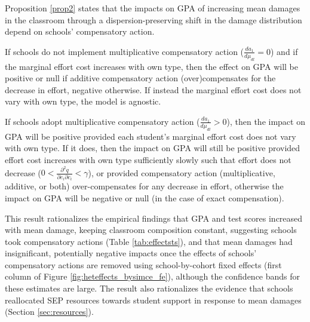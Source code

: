 Proposition \ref{prop2} states that the impacts on GPA of increasing mean damages in the classroom through a dispersion-preserving shift in the damage distribution depend on schools' compensatory action.\par 
If schools do not implement multiplicative compensatory action ($\frac{d a_1}{d \mu_{dl}}=0$) and if the marginal effort cost increases with own type, then the effect on GPA will be positive or null if additive compensatory action (over)compensates for the decrease in effort, negative otherwise. If instead the marginal effort cost does not vary with own type, the model is agnostic.\par 
If schools adopt multiplicative compensatory action  ($\frac{d a_1}{d \mu_{dl}}>0$), then the impact on GPA will be positive provided each student's marginal effort cost does not vary with own type. If it does, then the impact on GPA will still be positive provided effort cost increases with own type sufficiently slowly such that effort does not decrease ($0< \frac{\partial^2 q}{\partial e_i \partial c_i}<\gamma$), or provided compensatory action (multiplicative, additive, or both) over-compensates for any decrease in effort, otherwise the impact on GPA will be negative or null (in the case of exact compensation).



This result rationalizes the empirical findings that GPA and test scores increased with mean damage, keeping classroom composition constant, suggesting schools took compensatory actions (Table \ref{tab:effectsts}), and that mean damages had insignificant, potentially negative impacts once the effects of schools' compensatory actions are removed using school-by-cohort fixed effects (first column of Figure \ref{fig:heteffects_bysimce_fe}), although the confidence bands for these estimates are large. The result also rationalizes the evidence that schools reallocated SEP resources towards student support in response to mean damages (Section \ref{sec:resources}).\par 


